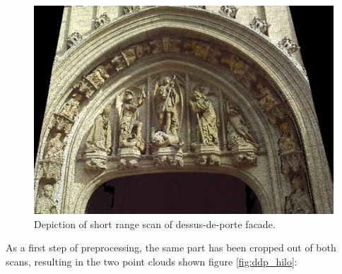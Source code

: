 \begin{figure}[h]
\centering
\includegraphics[width=.6\textwidth]{fig/scan_012.png}
\caption{Depiction of short range scan of dessus-de-porte facade.}
\label{fig:scan_012}
\end{figure}

As a 	first step of preprocessing, the same part has been cropped out of both scans, resulting in the two point clouds shown figure \ref{fig:ddp_hilo}:

